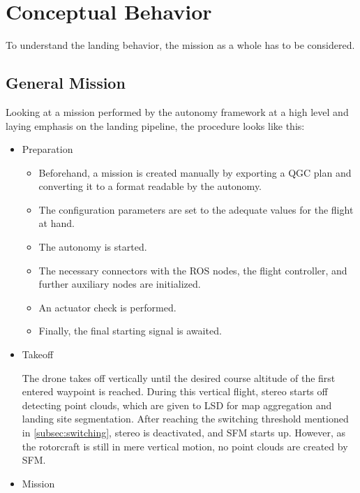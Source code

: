 \section{Conceptual Behavior}\label{sec:concept_beh}

To understand the landing behavior, the mission as a whole has to be considered.

\subsection{General Mission}

Looking at a mission performed by the autonomy framework at a high level and laying emphasis on the landing pipeline, the procedure looks like this:

\begin{itemize}
    \item Preparation
    
        \begin{itemize}
            \item Beforehand, a mission is created manually by exporting a QGC plan and converting it to a format readable by the autonomy.
            \item The configuration parameters are set to the adequate values for the flight at hand.
            \item The autonomy is started.
            \item The necessary connectors with the ROS nodes, the flight controller, and further auxiliary nodes are initialized.
            \item An actuator check is performed.
            \item Finally, the final starting signal is awaited.
        \end{itemize}
        

    \item Takeoff
    
    The drone takes off vertically until the desired course altitude of the first entered waypoint is reached. During this vertical flight, stereo starts off detecting point clouds, which are given to LSD for map aggregation and landing site segmentation. After reaching the switching threshold mentioned in \cref{subsec:switching}, stereo is deactivated, and SFM starts up. However, as the rotorcraft is still in mere vertical motion, no point clouds are created by SFM.

    \item Mission


\end{itemize}
